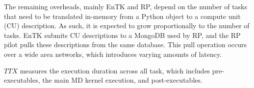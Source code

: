 The remaining overheads, mainly EnTK and RP, depend on the number of tasks that need to be
translated in-memory from a Python object to a compute unit (CU) description. As such, it is
expected to grow proportionally to the number of tasks. EnTK submits CU descriptions to a 
MongoDB used by RP, and the RP pilot pulls these descriptions from the same database. 
This pull operation occurs over a wide area networks, which introduces varying amounts of latency. 

\(TTX\) measures the execution duration across all task, which includes pre-executables, the 
main MD kernel execution, and post-executables.


